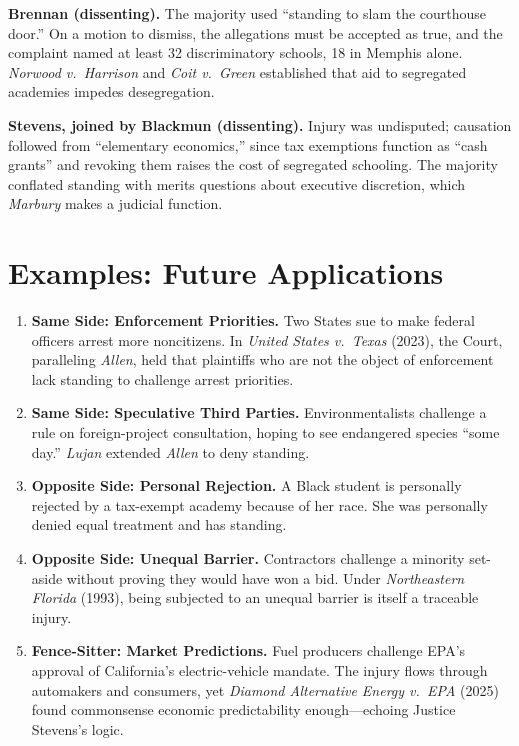 \documentclass[12pt]{article}
\begin{document}
\textbf{Brennan (dissenting).} The majority used ``standing to slam the courthouse door.'' On a motion to dismiss, the allegations must be accepted as true, and the complaint named at least 32 discriminatory schools, 18 in Memphis alone. \textit{Norwood v.\ Harrison} and \textit{Coit v.\ Green} established that aid to segregated academies impedes desegregation.

\textbf{Stevens, joined by Blackmun (dissenting).} Injury was undisputed; causation followed from ``elementary economics,'' since tax exemptions function as ``cash grants'' and revoking them raises the cost of segregated schooling. The majority conflated standing with merits questions about executive discretion, which \textit{Marbury} makes a judicial function.

\section{Examples: Future Applications}

\begin{enumerate}
\item \textbf{Same Side: Enforcement Priorities.} Two States sue to make federal officers arrest more noncitizens. In \textit{United States v.\ Texas} (2023), the Court, paralleling \textit{Allen}, held that plaintiffs who are not the object of enforcement lack standing to challenge arrest priorities.
\item \textbf{Same Side: Speculative Third Parties.} Environmentalists challenge a rule on foreign-project consultation, hoping to see endangered species ``some day.'' \textit{Lujan} extended \textit{Allen} to deny standing.
\item \textbf{Opposite Side: Personal Rejection.} A Black student is personally rejected by a tax-exempt academy because of her race. She was personally denied equal treatment and has standing.
\item \textbf{Opposite Side: Unequal Barrier.} Contractors challenge a minority set-aside without proving they would have won a bid. Under \textit{Northeastern Florida} (1993), being subjected to an unequal barrier is itself a traceable injury.
\item \textbf{Fence-Sitter: Market Predictions.} Fuel producers challenge EPA's approval of California's electric-vehicle mandate. The injury flows through automakers and consumers, yet \textit{Diamond Alternative Energy v.\ EPA} (2025) found commonsense economic predictability enough---echoing Justice Stevens's logic.
\end{enumerate}
\end{document}
